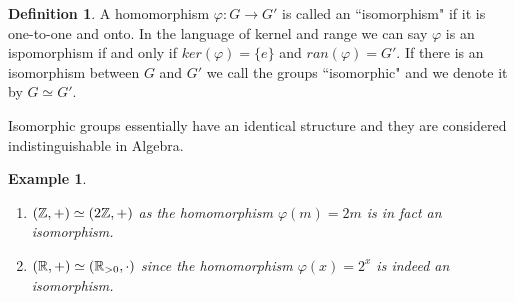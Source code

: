 \documentclass[12pt]{article}
\theoremstyle{plain}
\newtheorem{example}{Example}
\theoremstyle{definition}
\newtheorem{definition}{Definition}
\theoremstyle{remark}
\begin{document}
 \begin{definition}
 A homomorphism $\varphi:G\rightarrow G'$ is called an ``isomorphism" if it is one-to-one and onto. In the language of kernel and range we can say $\varphi$ is an ispomorphism if and only if $ker(\varphi)=\{e\}$ and $ran(\varphi)=G'$.
 If there is an isomorphism between $G$ and $G'$ we call the groups ``isomorphic" and we denote it by $G\simeq G'$.
 \end{definition}
 Isomorphic groups essentially have an identical structure and they are considered indistinguishable in Algebra.

 \begin{example}
\begin{enumerate}
    \item $(\mathbb{Z}, +) \simeq (2\mathbb{Z}, +)$ as the homomorphism $\varphi(m)=2m$ is in fact an isomorphism.
     \item $(\mathbb{R}, +) \simeq (\mathbb{R}_{>0},\cdot)$ since the homomorphism $\varphi(x) = 2^x$ is indeed an isomorphism.
\end{enumerate}
 \end{example}
\end{document}
